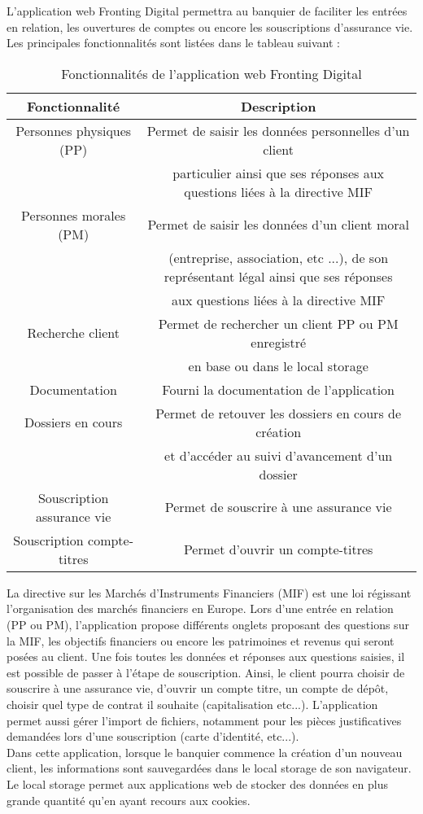 	L'application web Fronting Digital permettra au banquier de faciliter les entrées en relation, les ouvertures de comptes ou encore les souscriptions d'assurance vie. Les principales fonctionnalités sont listées dans le tableau suivant :
	
\begin{table}[h!]
	\center
	\begin{tabular}{| c | c |}
     \hline
     Fonctionnalité & Description \\ \hline
     Personnes physiques (PP) & Permet de saisir les données personnelles d'un client \\ & particulier ainsi que ses réponses aux questions liées à la directive MIF\\ \hline
     Personnes morales (PM) & Permet de saisir les données d'un client moral \\ & (entreprise, association, etc ...), de son représentant légal ainsi que ses réponses \\ & aux questions liées à la directive MIF\\ \hline
     Recherche client & Permet de rechercher un client PP ou PM enregistré \\ & en base ou dans le local storage \\ \hline
     Documentation & Fourni la documentation de l'application \\ \hline
     Dossiers en cours & Permet de retouver les dossiers en cours de création \\ & et d'accéder au suivi d'avancement d'un dossier\\ \hline
	 Souscription assurance vie & Permet de souscrire à une assurance vie\\ \hline
	 Souscription compte-titres & Permet d'ouvrir un compte-titres\\ \hline
	\end{tabular}
	\caption{Fonctionnalités de l'application web Fronting Digital}
	\label{fonctionnalitesBP1818}
\end{table}

	La directive sur les Marchés d'Instruments Financiers (MIF) est une loi régissant l'organisation des marchés financiers en Europe. Lors d'une entrée en relation (PP ou PM), l'application propose différents onglets proposant des questions sur la MIF, les objectifs financiers ou encore les patrimoines et revenus qui seront posées au client. Une fois toutes les données et réponses aux questions saisies, il est possible de passer à l'étape de souscription. Ainsi, le client pourra choisir de souscrire à une assurance vie, d'ouvrir un compte titre, un compte de dépôt, choisir quel type de contrat il souhaite (capitalisation etc...). L'application permet aussi gérer l'import de fichiers, notamment pour les pièces justificatives demandées lors d'une souscription (carte d'identité, etc...). \\
	
	Dans cette application, lorsque le banquier commence la création d'un nouveau client, les informations sont sauvegardées dans le local storage de son navigateur. Le local storage permet aux applications web de stocker des données en plus grande quantité qu'en ayant recours aux cookies.